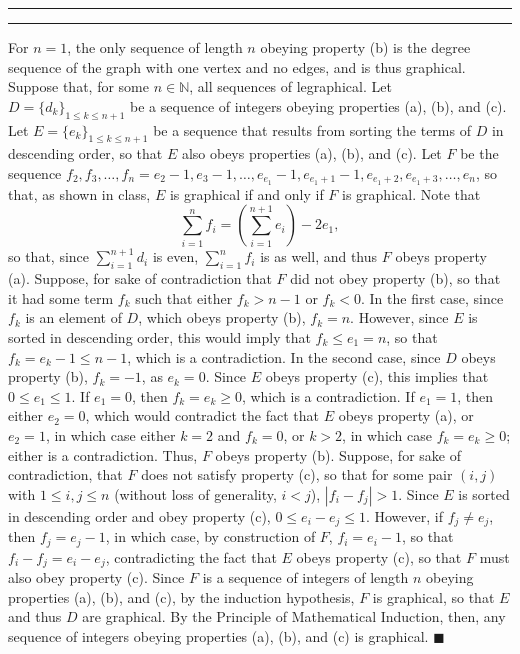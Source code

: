 \documentclass[11pt]{article}
\newcounter{questionCounter}
\newcounter{partCounter}[questionCounter]
\newenvironment{question}[2][\arabic{questionCounter}]{%
    \setcounter{partCounter}{0}%
    \vspace{.25in} \hrule \vspace{0.5em}%
        \noindent{\bf #2}%
    \vspace{0.8em} \hrule \vspace{.10in}%
    \addtocounter{questionCounter}{1}%
}{}
\begin{document}
\begin{question}{Problem 6} For $n = 1$, the only sequence of length $n$
obeying property (b) is the degree sequence of the graph with one vertex and
no edges, and is thus graphical. Suppose that, for some $n \in \mathbb{N}$,
all sequences of legraphical. Let $D = \{d_k\}_{1 \leq k \leq n + 1}$ be a sequence of
integers obeying properties (a), (b), and (c). Let
$E = \{e_k\}_{1 \leq k \leq n + 1}$ be a sequence that results from sorting
the terms of $D$ in descending order, so that $E$ also obeys properties (a),
(b), and (c). Let $F$ be the sequence
$f_2, f_3, \ldots, f_n = e_2 - 1, e_3 - 1, \ldots, e_{e_1} - 1,
e_{e_1 + 1} - 1, e_{e_1 + 2}, e_{e_1 + 3}, \ldots, e_n$, so that, as shown in
class, $E$ is graphical if and only if $F$ is graphical. Note that
\[\sum_{i = 1}^n f_i = \left( \sum_{i = 1}^{n + 1} e_i \right) - 2e_1,\]
so that, since $\sum_{i = 1}^{n + 1} d_i$ is even, $\sum_{i = 1}^n f_i$ is as
well, and thus $F$ obeys property (a). Suppose, for sake of contradiction
that $F$ did not obey property (b), so that it had some term $f_k$ such that
either $f_k > n - 1$ or $f_k < 0$. In the first case, since $f_k$ is an
element of $D$, which obeys property (b), $f_k = n$. However, since $E$ is
sorted in descending order, this would imply that $f_k \leq e_1 = n$, so that
$f_k = e_k - 1 \leq n - 1$, which is a contradiction. In the second case,
since $D$ obeys property (b), $f_k = -1$, as $e_k = 0$. Since $E$ obeys
property (c), this implies that $0 \leq e_1 \leq 1$. If $e_1 = 0$, then
$f_k = e_k \geq 0$, which is a contradiction. If $e_1 = 1$, then either
$e_2 = 0$, which would contradict the fact that $E$ obeys property (a), or
$e_2 = 1$, in which case either $k = 2$ and $f_k = 0$, or $k > 2$, in which
case $f_k = e_k \geq 0$; either is a contradiction. Thus, $F$ obeys property
(b). Suppose, for sake of contradiction, that $F$ does not satisfy property
(c), so that for some pair $(i, j)$ with $1 \leq i, j \leq n$ (without loss of
generality, $i < j$), $|f_i - f_j| > 1$. Since $E$ is sorted in descending
order and obey property (c), $0 \leq e_i - e_j \leq 1$. However, if
$f_j \neq e_j$, then $f_j = e_j - 1$, in which case, by construction of $F$,
$f_i = e_i - 1$, so that $f_i - f_j = e_i - e_j$, contradicting the fact that
$E$ obeys property (c), so that $F$ must also obey property (c).
Since $F$ is a sequence of integers of length $n$ obeying properties (a), (b),
and (c), by the induction hypothesis, $F$ is graphical, so that $E$ and thus
$D$ are graphical. By the Principle of Mathematical Induction, then, any
sequence of integers obeying properties (a), (b), and (c) is graphical. \qquad
$\blacksquare$
\end{question}
\end{document}
